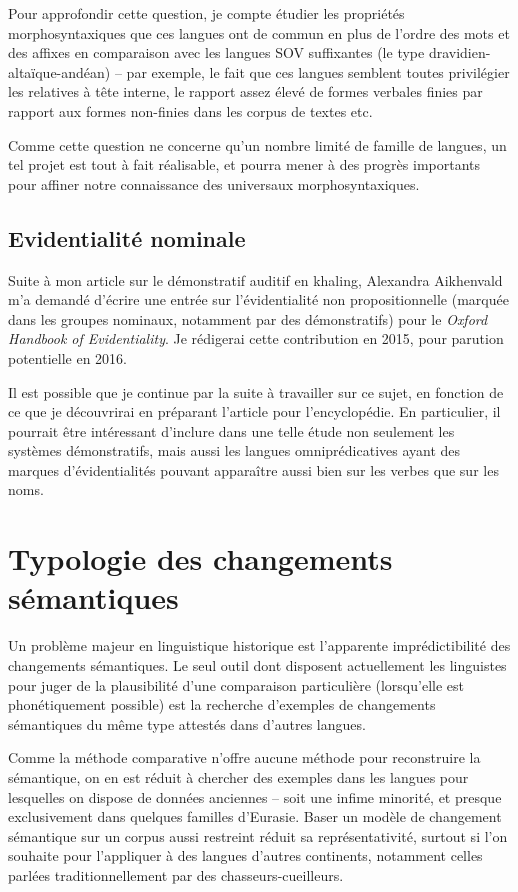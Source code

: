 \documentclass[oldfontcommands,oneside,a4paper,11pt]{article}
\begin{document}
Pour approfondir cette question, je compte étudier les propriétés morphosyntaxiques que ces langues ont de commun en plus de l'ordre des mots et des affixes en comparaison avec les langues SOV suffixantes (le type dravidien-altaïque-andéan) -- par exemple, le fait que ces langues semblent toutes privilégier les relatives à tête interne, le rapport assez élevé de formes verbales finies par rapport aux formes non-finies dans les corpus de textes etc. 

Comme cette question ne concerne qu'un nombre limité de famille de langues, un tel projet est tout à fait réalisable, et pourra mener à des progrès importants pour affiner notre connaissance des universaux morphosyntaxiques.

\subsection{Evidentialité nominale}
Suite à mon article \citet{jacques14auditory} sur le démonstratif auditif en khaling, Alexandra Aikhenvald m'a demandé d'écrire une entrée sur l'évidentialité non propositionnelle (marquée dans les groupes nominaux, notamment par des démonstratifs) pour le \textit{Oxford Handbook of Evidentiality}. Je rédigerai cette contribution en 2015, pour parution potentielle en 2016.

Il est possible que je continue par la suite à travailler sur ce sujet, en fonction de ce que je découvrirai en préparant l'article pour l'encyclopédie. En particulier, il pourrait être intéressant d'inclure dans une telle étude non seulement les systèmes démonstratifs, mais aussi les langues omniprédicatives ayant des marques d'évidentialités pouvant apparaître aussi bien sur les verbes que sur les noms.

\section{Typologie des changements sémantiques}
Un problème majeur en linguistique historique est l'apparente imprédictibilité des changements sémantiques. Le seul outil dont disposent actuellement les linguistes pour juger de la plausibilité d'une comparaison particulière (lorsqu'elle est phonétiquement possible) est la recherche d'exemples de changements sémantiques du même type attestés dans d'autres langues.

Comme la méthode comparative n'offre aucune méthode pour reconstruire la sémantique, on en est réduit à chercher des exemples dans les langues pour lesquelles on dispose de données anciennes -- soit une infime minorité, et presque exclusivement dans quelques familles d'Eurasie. Baser un modèle de changement sémantique sur un corpus aussi restreint réduit sa représentativité, surtout si l'on souhaite pour l'appliquer à des langues d'autres continents, notamment celles parlées traditionnellement par des chasseurs-cueilleurs.
 
\end{document}

